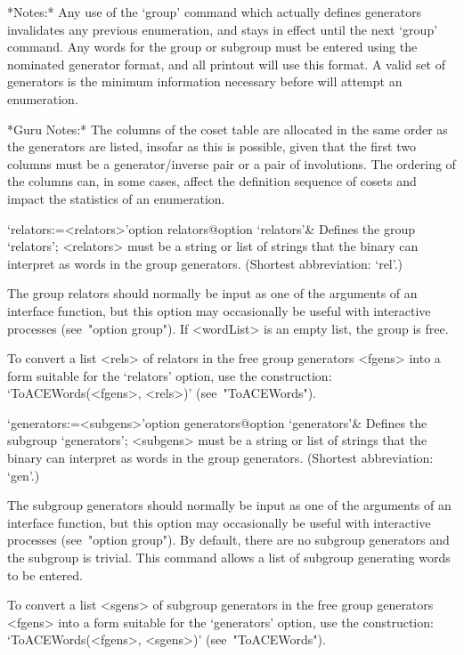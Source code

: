 *Notes:*
Any use of the  `group'  command  which  actually  defines  generators
invalidates any previous enumeration, and stays in  effect  until  the
next `group' command. Any words for the  group  or  subgroup  must  be
entered using the nominated generator format, and  all  printout  will
use this format. A valid set of generators is the minimum  information
necessary before {\ACE} will attempt an enumeration.

*Guru Notes:*
The columns of the coset table are allocated in the same order as  the
generators are listed, insofar as this is  possible,  given  that  the
first two columns must be  a  generator/inverse  pair  or  a  pair  of
involutions. The ordering of the columns can, in  some  cases,  affect
the definition sequence of cosets and  impact  the  statistics  of  an
enumeration.

\>`relators:=<relators>'{option relators}@{option `relators'}&
Defines the group `relators'; <relators> must be a string or  list  of
strings that the {\ACE} binary can interpret as  words  in  the  group
generators. (Shortest abbreviation: `rel'.)

The group relators should normally be input as one of the arguments of
an {\ACE} interface function, but  this  option  may  occasionally  be
useful with interactive processes (see~"option group"). If  <wordList>
is an empty list, the group is free.

To convert a  {\GAP}  list  <rels>  of  relators  in  the  free  group
generators <fgens> into a form suitable for the `relators' option, use
the construction: `ToACEWords(<fgens>, <rels>)' (see~"ToACEWords").

\>`generators:=<subgens>'{option  generators}@{option `generators'}&
Defines the subgroup `generators'; <subgens> must be a string or  list
of strings that the {\ACE} binary can interpret as words in the  group
generators. (Shortest abbreviation: `gen'.)

The subgroup generators  should  normally  be  input  as  one  of  the
arguments of  an  {\ACE}  interface  function,  but  this  option  may
occasionally  be  useful  with  interactive   processes   (see~"option
group"). By default, there are no subgroup generators and the subgroup
is trivial. This command allows a list of subgroup generating words to
be entered.

To convert a {\GAP} list <sgens> of subgroup generators  in  the  free
group generators <fgens> into a form  suitable  for  the  `generators'
option,   use   the   construction:   `ToACEWords(<fgens>,   <sgens>)'
(see~"ToACEWords").

